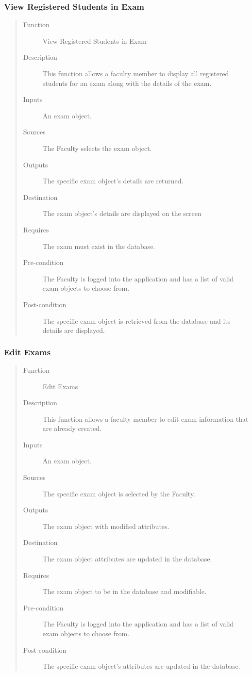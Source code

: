 \subsubsection{View Registered Students in Exam}
\begin{quote} %
\begin{description}
\item[Function]
   View Registered Students in Exam
\item[Description]
   This function allows a faculty member to display all registered students for
   an exam along with the details of the exam.
\item[Inputs]
   An exam object.
\item[Sources]
   The Faculty selects the exam object.
\item[Outputs]
   The specific exam object's details are returned.
\item[Destination]
   The exam object's details are displayed on the screen
\item[Requires]
   The exam must exist in the database.
\item[Pre-condition]
   The Faculty is logged into the application and has a list of valid exam objects
   to choose from.
\item[Post-condition]
   The specific exam object is retrieved from the database and its details are
   displayed.
\end{description}
\end{quote} %

\subsubsection{Edit Exams}
\begin{quote} %
\begin{description}
\item[Function]
   Edit Exams
\item[Description]
   This function allows a faculty member to edit exam information that are
   already created.
\item[Inputs]
   An exam object.
\item[Sources]
   The specific exam object is selected by the Faculty.
\item[Outputs]
   The exam object with modified attributes.
\item[Destination]
   The exam object attributes are updated in the database.
\item[Requires]
   The exam object to be in the database and modifiable.
\item[Pre-condition]
   The Faculty is logged into the application and has a list of valid exam objects
   to choose from.
\item[Post-condition]
   The specific exam object's attributes are updated in the database.
\end{description}
\end{quote} %

